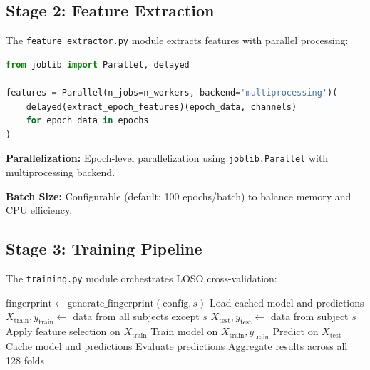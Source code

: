 \subsection{Stage 2: Feature Extraction}
\label{subsec:feature_extraction_impl}

The \texttt{feature\_extractor.py} module extracts features with parallel processing:

\begin{lstlisting}[language=Python]
from joblib import Parallel, delayed

features = Parallel(n_jobs=n_workers, backend='multiprocessing')(
    delayed(extract_epoch_features)(epoch_data, channels)
    for epoch_data in epochs
)
\end{lstlisting}

\textbf{Parallelization:} Epoch-level parallelization using \texttt{joblib.Parallel} with multiprocessing backend.

\textbf{Batch Size:} Configurable (default: 100 epochs/batch) to balance memory and CPU efficiency.


\subsection{Stage 3: Training Pipeline}
\label{subsec:training_impl}

The \texttt{training.py} module orchestrates LOSO cross-validation:

\begin{algorithm}[htbp]
\caption{LOSO Cross-Validation with Model Cache}
\label{alg:loso}
\begin{algorithmic}[1]
    \STATE $\text{fingerprint} \leftarrow \text{generate\_fingerprint}(\text{config}, s)$
        \STATE Load cached model and predictions
    \ELSE
        \STATE $X_{\text{train}}, y_{\text{train}} \leftarrow$ data from all subjects except $s$
        \STATE $X_{\text{test}}, y_{\text{test}} \leftarrow$ data from subject $s$
        \STATE Apply feature selection on $X_{\text{train}}$
        \STATE Train model on $X_{\text{train}}, y_{\text{train}}$
        \STATE Predict on $X_{\text{test}}$
        \STATE Cache model and predictions
    \ENDIF
    \STATE Evaluate predictions
\ENDFOR
\STATE Aggregate results across all 128 folds
\end{algorithmic}
\end{algorithm}

